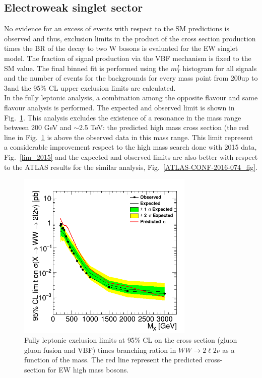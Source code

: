\subsection*{Electroweak singlet sector}
No evidence for an excess of events with respect to the SM predictions  is observed and thus, exclusion
limits in the product of the cross section production times the BR of the decay to two W bosons is evaluated for the EW singlet model. The fraction of signal production via the VBF mechanism is fixed to the SM value.
The final binned fit is performed using the $m_T^I$ histogram for all signals and the number of events for the backgrounds for every mass point from
200\GeV up to 3\TeV and the 95\% CL upper exclusion limits are calculated. \\
\newline
In the fully leptonic analysis, a combination among the opposite flavour and same flavour analysis is performed. 
The expected and observed limit is shown in Fig.~\ref{fig:lim_OFSF_comb}. 
This analysis excludes the existence of a resonance in the mass range between 200 GeV and $\sim$2.5 TeV: 
the predicted high mass cross section (the red line in Fig.~\ref{fig:lim_OFSF_comb} is above the observed data in this mass range.
This limit represent a considerable improvement respect to the high mass search done with 2015 data, Fig.~\ref{lim_2015} 
and the expected and observed limits are also better with respect to the ATLAS results for the similar analysis, Fig.~\ref{ATLAS-CONF-2016-074_fig}.\\
\begin{figure}[htb]
\centering
\includegraphics[width=0.75\textwidth]{../AN/Figs/unblinding/Limits/c2_FullComb_unbl.png}
\caption{Fully leptonic  exclusion limits at 95$\%$ CL on the cross section (gluon gluon fusion and VBF) times branching ration in $WW \to 2\ell 2\nu$ 
as a function of the mass. The red line represent the predicted cross-section for EW high mass bosons.}
\label{fig:lim_OFSF_comb}
\end{figure}



